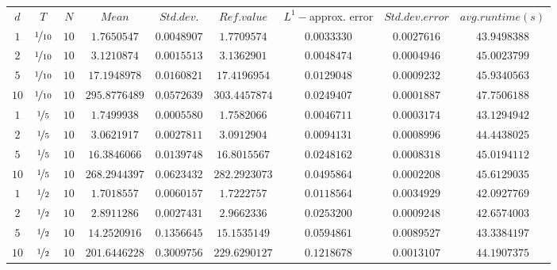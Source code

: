 \begin{tabular}{ccccccccc}
$d$ & $T$ & $N$ & $Mean$ & $Std. dev.$ & $Ref. value$ & $L^1-$approx. error & $Std. dev. error$ & $avg. runtime (s)$\\
$1$ & $\nicefrac{1}{10}$ & $10$ & $1.7650547$ & $0.0048907$ & $1.7709574$ & $0.0033330$ & $0.0027616$ & $43.9498388$\\
$2$ & $\nicefrac{1}{10}$ & $10$ & $3.1210874$ & $0.0015513$ & $3.1362901$ & $0.0048474$ & $0.0004946$ & $45.0023799$\\
$5$ & $\nicefrac{1}{10}$ & $10$ & $17.1948978$ & $0.0160821$ & $17.4196954$ & $0.0129048$ & $0.0009232$ & $45.9340563$\\
$10$ & $\nicefrac{1}{10}$ & $10$ & $295.8776489$ & $0.0572639$ & $303.4457874$ & $0.0249407$ & $0.0001887$ & $47.7506188$\\
$1$ & $\nicefrac{1}{5}$ & $10$ & $1.7499938$ & $0.0005580$ & $1.7582066$ & $0.0046711$ & $0.0003174$ & $43.1294942$\\
$2$ & $\nicefrac{1}{5}$ & $10$ & $3.0621917$ & $0.0027811$ & $3.0912904$ & $0.0094131$ & $0.0008996$ & $44.4438025$\\
$5$ & $\nicefrac{1}{5}$ & $10$ & $16.3846066$ & $0.0139748$ & $16.8015567$ & $0.0248162$ & $0.0008318$ & $45.0194112$\\
$10$ & $\nicefrac{1}{5}$ & $10$ & $268.2944397$ & $0.0623432$ & $282.2923073$ & $0.0495864$ & $0.0002208$ & $45.6129035$\\
$1$ & $\nicefrac{1}{2}$ & $10$ & $1.7018557$ & $0.0060157$ & $1.7222757$ & $0.0118564$ & $0.0034929$ & $42.0927769$\\
$2$ & $\nicefrac{1}{2}$ & $10$ & $2.8911286$ & $0.0027431$ & $2.9662336$ & $0.0253200$ & $0.0009248$ & $42.6574003$\\
$5$ & $\nicefrac{1}{2}$ & $10$ & $14.2520916$ & $0.1356645$ & $15.1535149$ & $0.0594861$ & $0.0089527$ & $43.3384197$\\
$10$ & $\nicefrac{1}{2}$ & $10$ & $201.6446228$ & $0.3009756$ & $229.6290127$ & $0.1218678$ & $0.0013107$ & $44.1907375$\\
\end{tabular}
